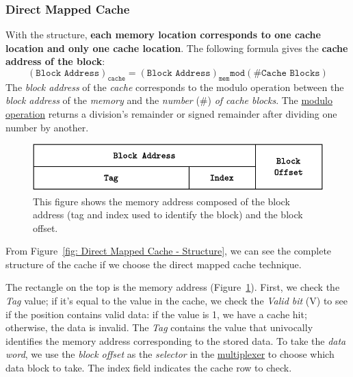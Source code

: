 \label{Direct Mapped Cache}
\hypertarget{Direct Mapped Cache}{\subsubsection*{\textcolor{Red2}{Direct Mapped Cache}}}

With the  structure, \textbf{each memory location corresponds to one cache location and only one cache location}. The following formula gives the \textbf{cache address of the block}:
\begin{equation}\label{eq: direct mapped cache}
    \left(\texttt{Block Address}\right)_{\texttt{cache}} = \left(\texttt{Block Address}\right)_{\texttt{mem}} \texttt{mod} \left(\texttt{\# Cache Blocks}\right)
\end{equation}
The \emph{block address} of the \emph{cache} corresponds to the modulo operation between the \emph{block address} of the \emph{memory} and the \emph{number} (\#) \emph{of cache blocks}. The \href{https://en.wikipedia.org/wiki/Modulo}{modulo operation} returns a division's remainder or signed remainder after dividing one number by another.

\begin{figure}[!htp]
    \centering
    \includegraphics[width=.9\textwidth]{img/direct-mapped-cache-1.pdf}
    \caption{This figure shows the memory address composed of the block address (tag and index used to identify the block) and the block offset.}
    \label{fig: Memory Address - Direct Mapped Cache}
\end{figure}

\noindent
From Figure~\ref{fig: Direct Mapped Cache - Structure}, we can see the complete structure of the cache if we choose the direct mapped cache technique. 

\highspace
The rectangle on the top is the memory address (Figure~\ref{fig: Memory Address - Direct Mapped Cache}). First, we check the \emph{Tag} value; if it's equal to the value in the cache, we check the \emph{Valid bit} (V) to see if the position contains valid data: if the value is 1, we have a cache hit; otherwise, the data is invalid. The \emph{Tag} contains the value that univocally identifies the memory address corresponding to the stored data. To take the \emph{data word}, we use the \emph{block offset} as the \emph{selector} in the \href{https://en.wikipedia.org/wiki/Multiplexer}{multiplexer} to choose which data block to take. The index field indicates the cache row to check.

